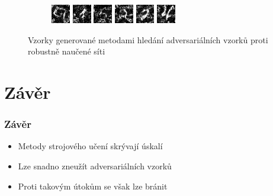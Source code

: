 \documentclass[czech]{beamer}
\begin{document}
\begin{frame}
\begin{figure}
\begin{subfigure}[b]{\textwidth}
            \includegraphics[width=0.09\textwidth]{Images/Graphics/AEXAMPLES/R_ALLGEN/cw_2.png}
            \includegraphics[width=0.09\textwidth]{Images/Graphics/AEXAMPLES/R_ALLGEN/cw_34.png}
            \includegraphics[width=0.09\textwidth]{Images/Graphics/AEXAMPLES/R_ALLGEN/cw_18.png}
            \includegraphics[width=0.09\textwidth]{Images/Graphics/AEXAMPLES/R_ALLGEN/cw_37.png}
            \includegraphics[width=0.09\textwidth]{Images/Graphics/AEXAMPLES/R_ALLGEN/cw_17.png}
            \includegraphics[width=0.09\textwidth]{Images/Graphics/AEXAMPLES/R_ALLGEN/cw_4.png}
        \end{subfigure}
        \centering
        \caption{Vzorky generované metodami hledání adversariálních vzorků proti robustně naučené síti}
        \label{r_allgen}
    \end{figure}
\end{frame}

\section*{Závěr}

\begin{frame}
    \frametitle{Závěr}
    \begin{itemize}
        \item Metody strojového učení skrývají úskalí
        \item Lze snadno zneužít adversariálních vzorků
        \item Proti takovým útokům se však lze bránit
    \end{itemize}
\end{frame}
\end{document}
